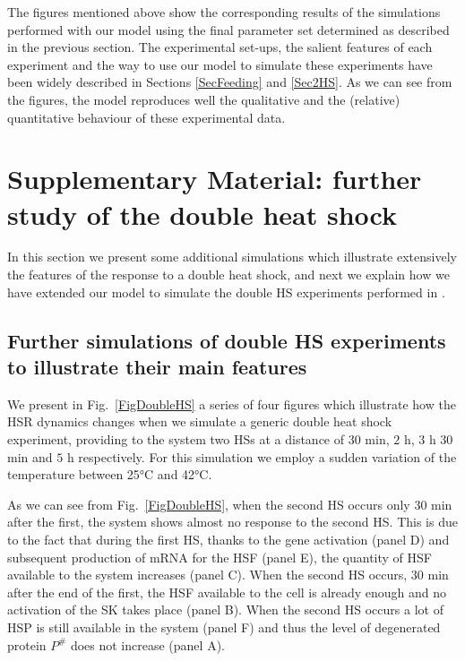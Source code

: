 \documentclass[oneside, 10pt, a4paper, twocolumn]{article}
\begin{document}
The figures mentioned above show the corresponding results of the simulations performed with our model using the final parameter set determined as described in the previous section. 
The experimental set-ups, the salient features of each experiment and the way to use our model to simulate these experiments have been widely described in Sections \ref{SecFeeding} and \ref{Sec2HS}.
As we can see from the figures, the model reproduces well the qualitative and the (relative) quantitative behaviour of these experimental data.





\section{Supplementary Material: further study of the double heat shock}

In this section we present some additional simulations which illustrate extensively the features of the response to a double heat shock, and next we explain how we have extended our model to simulate the double HS experiments performed in \cite{Schroda2000}.




\subsection{Further simulations of double HS experiments to illustrate their main features}
\label{Sec2HSsimulations}

We present in Fig.~\ref{FigDoubleHS} a series of four figures which illustrate how the HSR dynamics changes when we simulate a generic double heat shock experiment, providing to the system two HSs at a distance of $30$ min, $2$ h, $3$ h $30$ min and $5$ h respectively. For this simulation we employ a sudden variation of the temperature between 25°C and 42°C.

As we can see from Fig.~\ref{FigDoubleHS}, when the second HS occurs only $30$ min after the first, the system shows almost no response to the second HS. This is due to the fact that during the first HS, thanks to the gene activation (panel D) and subsequent production of mRNA for the HSF (panel E), the quantity of HSF available to the system increases (panel C). When the second HS occurs, $30$ min after the end of the first, the HSF available to the cell is already enough and no activation of the SK takes place (panel B). When the second HS occurs a lot of HSP is still available in the system (panel F) and thus the level of degenerated protein $P^\#$ does not increase (panel A).
\end{document}
